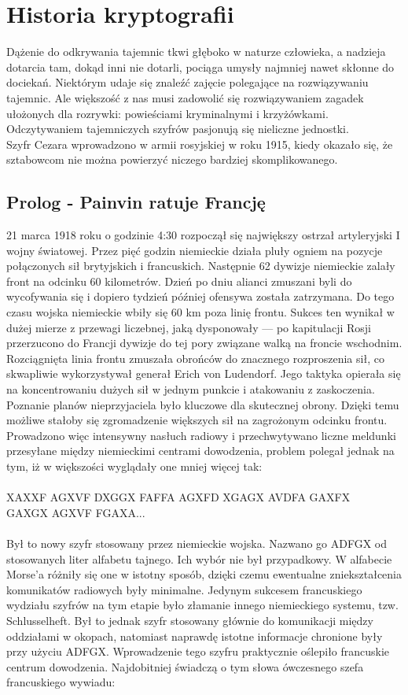 \documentclass[10pt, a4paper, titlepage]{article}
\begin{document}
\section{Historia kryptografii}
Dążenie do odkrywania tajemnic tkwi głęboko w naturze człowieka, a nadzieja dotarcia tam, dokąd inni nie dotarli, pociąga umysły najmniej nawet skłonne do dociekań. Niektórym udaje się znaleźć zajęcie polegające na rozwiązywaniu tajemnic. Ale większość z nas musi zadowolić się rozwiązywaniem zagadek ułożonych dla rozrywki: powieściami kryminalnymi i krzyżówkami. Odczytywaniem tajemniczych szyfrów pasjonują się nieliczne jednostki.\\
Szyfr Cezara wprowadzono w armii rosyjskiej w roku 1915, kiedy okazało się, że sztabowcom nie
można powierzyć niczego bardziej skomplikowanego.
\subsection{Prolog - Painvin ratuje Francję}
21 marca 1918 roku o godzinie 4:30 rozpoczął się największy ostrzał artyleryjski I wojny światowej. Przez pięć godzin niemieckie działa pluły ogniem na pozycje połączonych sił brytyjskich i francuskich. Następnie 62 dywizje niemieckie zalały front na odcinku 60 kilometrów. Dzień po dniu alianci zmuszani byli do wycofywania się i dopiero tydzień później ofensywa została zatrzymana. Do tego czasu wojska niemieckie wbiły się 60 km poza linię frontu. Sukces ten wynikał w dużej mierze z przewagi liczebnej, jaką dysponowały — po kapitulacji Rosji przerzucono do Francji dywizje do tej pory związane walką na froncie wschodnim. Rozciągnięta linia frontu zmuszała obrońców do znacznego rozproszenia sił, co skwapliwie wykorzystywał generał Erich von Ludendorf. Jego taktyka opierała się na koncentrowaniu dużych sił w jednym punkcie i atakowaniu z zaskoczenia. Poznanie planów nieprzyjaciela było kluczowe dla skutecznej obrony. Dzięki temu możliwe stałoby się zgromadzenie większych sił na zagrożonym odcinku frontu. Prowadzono więc intensywny nasłuch radiowy i przechwytywano liczne meldunki przesyłane między niemieckimi centrami dowodzenia, problem polegał jednak na tym, iż w większości wyglądały one mniej więcej tak:
\\
\\
\indent XAXXF AGXVF DXGGX FAFFA AGXFD XGAGX AVDFA GAXFX\\
\indent GAXGX AGXVF FGAXA...\\
\\
Był to nowy szyfr stosowany przez niemieckie wojska. Nazwano go ADFGX od stosowanych liter alfabetu tajnego. Ich wybór nie był przypadkowy. W alfabecie Morse'a różniły się one w istotny sposób, dzięki czemu ewentualne zniekształcenia komunikatów radiowych były minimalne. Jedynym sukcesem francuskiego wydziału szyfrów na tym etapie było złamanie innego niemieckiego systemu, tzw. Schlusselheft. Był to jednak szyfr stosowany głównie do komunikacji między oddziałami w okopach, natomiast naprawdę istotne informacje chronione były przy użyciu ADFGX. Wprowadzenie tego szyfru praktycznie oślepiło francuskie centrum dowodzenia. Najdobitniej świadczą o tym słowa ówczesnego szefa francuskiego wywiadu:\\
\end{document}
